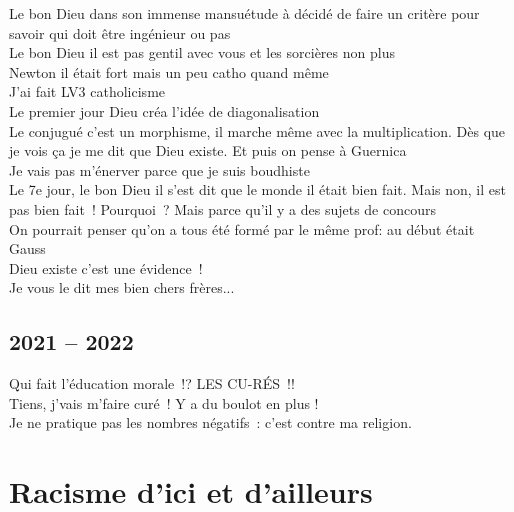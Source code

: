 \documentclass[french, a4paper, openany]{book}
\begin{document}
		\noindent \og Le bon Dieu dans son immense mansuétude à décidé de faire un critère pour savoir qui doit être ingénieur ou pas \fg \\
		\og Le bon Dieu il est pas gentil avec vous et les sorcières non plus \fg \\
		\og Newton il était fort mais un peu catho quand même \fg \\
		\og J'ai fait LV3 catholicisme \fg \\
		\og Le premier jour Dieu créa l'idée de diagonalisation \fg \\
		\og Le conjugué c'est un morphisme, il marche même avec la multiplication. Dès que je vois ça je me dit que Dieu existe. Et puis on pense à Guernica \fg \\
		\og Je vais pas m'énerver parce que je suis boudhiste \fg \\
		\og Le 7e jour, le bon Dieu il s'est dit que le monde il était bien fait. Mais non, il est pas bien fait~! Pourquoi~? Mais parce qu'il y a des sujets de concours \fg \\
		\og On pourrait penser qu'on a tous été formé par le même prof: au début était Gauss \fg \\
		\og Dieu existe c'est une évidence~! \fg \\
		\og Je vous le dit mes bien chers frères... \fg \\

	\subsection*{2021 -- 2022}
	
		\noindent \og Qui fait l'éducation morale~!? LES CU-RÉS~!! \fg \\
		\og Tiens, j'vais m'faire curé~! Y a du boulot en plus ! \fg \\
		\og Je ne pratique pas les nombres négatifs~: c'est contre ma religion. \fg \\

\section*{Racisme d'ici et d'ailleurs}
\end{document}
